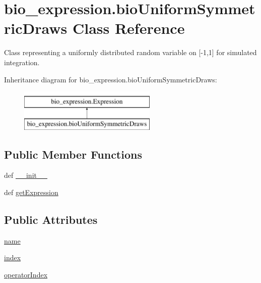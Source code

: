 \hypertarget{classbio__expression_1_1bio_uniform_symmetric_draws}{\section{bio\+\_\+expression.\+bio\+Uniform\+Symmetric\+Draws Class Reference}
\label{classbio__expression_1_1bio_uniform_symmetric_draws}
}


Class representing a uniformly distributed random variable on \mbox{[}-\/1,1\mbox{]} for simulated integration.  


Inheritance diagram for bio\+\_\+expression.\+bio\+Uniform\+Symmetric\+Draws\+:\begin{figure}[H]
\begin{center}
\leavevmode
\includegraphics[height=2.000000cm]{d3/d9b/classbio__expression_1_1bio_uniform_symmetric_draws}
\end{center}
\end{figure}
\subsection*{Public Member Functions}
\begin{DoxyCompactItemize}
\item 
def \hyperlink{classbio__expression_1_1bio_uniform_symmetric_draws_a8997eecc699c13ac3f1df4f148f2ca82}{\+\_\+\+\_\+init\+\_\+\+\_\+}
\item 
def \hyperlink{classbio__expression_1_1bio_uniform_symmetric_draws_acf37af2e6e1e7a68cd389ae83c648b3e}{get\+Expression}
\end{DoxyCompactItemize}
\subsection*{Public Attributes}
\begin{DoxyCompactItemize}
\item 
\hyperlink{classbio__expression_1_1bio_uniform_symmetric_draws_aab7be549ea560902d59e88bdb4cbb255}{name}
\item 
\hyperlink{classbio__expression_1_1bio_uniform_symmetric_draws_a07f762feb8b8f5ef9a6a98bc52adfa87}{index}
\item 
\hyperlink{classbio__expression_1_1bio_uniform_symmetric_draws_aeef138ac83667f40e020df25eed624a1}{operator\+Index}
\end{DoxyCompactItemize}


